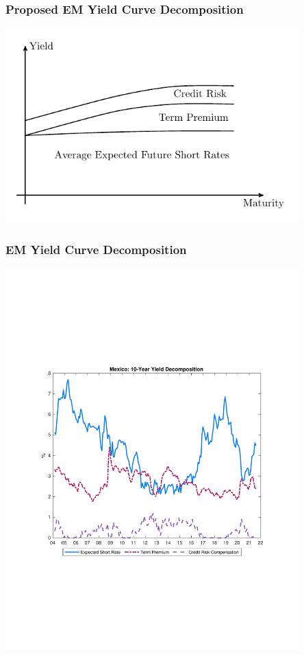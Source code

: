 \documentclass[12pt, aspectratio=169, xcolor=dvipsnames]{beamer}
\begin{document}
\begin{frame}
\frametitle{Proposed EM Yield Curve Decomposition}
\begin{center}
	\includegraphics[trim={0cm 0cm 0cm 0cm},clip,width=0.85\textwidth,height=0.95\textheight]{../Figures/YC/ycdcmp_EM}
\end{center}
\end{frame}


\begin{frame}
\frametitle{EM Yield Curve Decomposition}
\begin{center}
	\includegraphics[trim={0cm 0cm 0cm 0cm},clip,width=0.85\textwidth,height=0.9\textheight]{../Figures/Estimation/MX_dcmp}
\end{center}
\end{frame}
\end{document}
